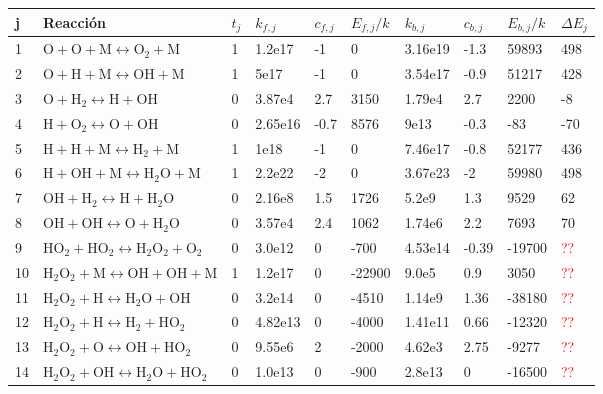 \documentclass[aps,prb,twocolumn,superscriptaddress,floatfix,longbibliography,10pt]{revtex4-2}
\begin{document}
\begin{table}[]
  \centering
  \begin{tabular}{llllllllll}
    \hline
    \multicolumn{1}{|l}{j \quad} &
    \multicolumn{1}{l}{Reacción} &
    \multicolumn{1}{l}{$t_j$ \quad} &
    \multicolumn{1}{l}{$k_{f,j}$ \quad} &
    \multicolumn{1}{l}{$c_{f,j}$ \quad} &
    \multicolumn{1}{l}{$E_{f,j}/k$ \quad} &
    \multicolumn{1}{l}{$k_{b,j}$ \quad} &
    \multicolumn{1}{l}{$c_{b,j}$ \quad} &
    \multicolumn{1}{l}{$E_{b,j}/k$ \quad} &
    \multicolumn{1}{l|}{$\Delta E_j$ \quad} \\ \hline
  1  & $\mathrm{O + O + M \leftrightarrow O_2 + M} $ &1      &1.2e17           &-1  &0  &3.16e19  &-1.3 &59893  & 498 \\
  2  & $\mathrm{O + H + M  \leftrightarrow OH + M} $ &1      &5e17           &-1  &0  &3.54e17  &-0.9  &51217 & 428\\
  3  & $\mathrm{O + H_2  \leftrightarrow H + OH} $ &0       &3.87e4           &2.7  &3150  &1.79e4  &2.7  &2200  &-8  \\
  4  & $\mathrm{H + O_2  \leftrightarrow O + OH} $ &0       &2.65e16           &-0.7  &8576  &9e13  &-0.3  &-83  &-70  \\
  5  & $\mathrm{H + H + M  \leftrightarrow H_2 + M} $ &1       &1e18           & -1  &0  &7.46e17  &-0.8  &52177 &436 \\
  6  & $\mathrm{H + OH + M  \leftrightarrow H_2O + M} $ &1       &2.2e22           &-2  &0  &3.67e23  &-2  &59980  &498  \\
  7  & $\mathrm{ OH + H_2  \leftrightarrow H + H_2O} $ &0       &2.16e8           &1.5  &1726  &5.2e9  &1.3  &9529  &62  \\
  8  & $\mathrm{ OH + OH \leftrightarrow O + H_2O} $ &0       &3.57e4           &2.4  &1062  &1.74e6  &2.2  &7693  &70 \\
  9  & $\mathrm{HO_2 + HO_2 \leftrightarrow H_2O_2 + O_2}$ & 0      &3.0e12           &0  &-700  &4.53e14  &-0.39  & -19700 & \textcolor{red}{??} \\
  10  & $\mathrm{H_2O_2 + M \leftrightarrow OH + OH + M}$ & 1      &1.2e17           &0  &-22900  &9.0e5  &0.9  & 3050 & \textcolor{red}{??} \\
  11  & $\mathrm{H_2O_2 + H \leftrightarrow H_2O + OH}$ & 0      &3.2e14           &0  &-4510  &1.14e9  &1.36  & -38180 & \textcolor{red}{??} \\
  12  & $\mathrm{H_2O_2 + H \leftrightarrow H_2 + HO_2}$ & 0      &4.82e13           &0  &-4000  &1.41e11  &0.66  & -12320  & \textcolor{red}{??} \\
  13  & $\mathrm{H_2O_2 + O \leftrightarrow OH + HO_2}$ & 0      &9.55e6           &2  &-2000  &4.62e3  &2.75  & -9277 & \textcolor{red}{??} \\
  14  & $\mathrm{H_2O_2 + OH \leftrightarrow H_2O + HO_2}$ & 0      &1.0e13           &0  &-900  &2.8e13  &0  & -16500 & \textcolor{red}{??} \\ \hline
\end{tabular}
\end{table}
\end{document}
